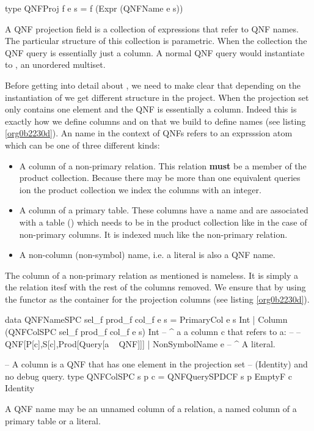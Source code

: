 \begin{code}
  \begin{haskellcode}
    type QNFProj f e s = f (Expr (QNFName e s))
  \end{haskellcode}
  \caption{\label{orgcefa865}A QNF projection field is a collection of expressions that refer to QNF names. The particular structure of this collection is parametric. When the collection  the QNF query is essentially just a column. A normal QNF query would instantiate  to , an unordered multiset.}
\end{code}

Before getting into detail about , we need to make clear
that depending on the instantiation of  we get different
structure in the project. When  the projection set
only contains one element and the QNF is essentially a column. Indeed
this is exactly how we define columns and on that we build to define
names (see listing \ref{org0b2230d}). An name in the context of QNFs
refers to an exprsssion atom which can be one of three different
kinds:

\begin{itemize}
\item A column of a non-primary relation. This relation \textbf{must} be a member
  of the product collection. Because there may be more than one
  equivalent queries ion the product collection we index the columns
  with an integer.
\item A column of a primary table. These columns have a name and are
  associated with a table () which needs to be in the product
  collection like in the case of non-primary columns. It is indexed
  much like the non-primary relation.
\item A non-column (non-symbol) name, i.e. a literal is also a QNF name.
\end{itemize}

The column of a non-primary relation as mentioned is nameless. It is
simply a the relation itesf with the rest of the columns removed. We
ensure that by using the  functor as the container for the
projection columns (see listing \ref{org0b2230d}).

\begin{code}
  \begin{haskellcode}
    data QNFNameSPC sel_f prod_f col_f e s
    = PrimaryCol e s Int
    | Column (QNFColSPC sel_f prod_f col_f e s) Int
    -- ^ a a column c that refers to a:
    --
    -- QNF[P[c],S[c],Prod[Query[a ~ QNF]]]
    | NonSymbolName e
    -- ^ A literal.

    -- A column is a QNF that has one element in the projection set
    -- (Identity) and no debug query.
    type QNFColSPC s p c = QNFQuerySPDCF s p EmptyF c Identity
  \end{haskellcode}
  \caption{\label{org0b2230d}A QNF name may be an unnamed column of a relation, a named column of a primary table or a literal.}
\end{code}

